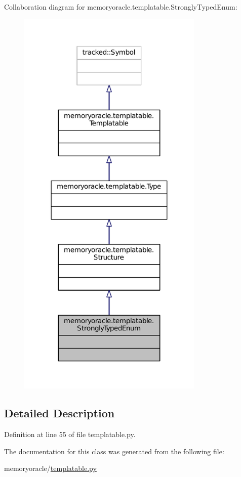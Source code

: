Collaboration diagram for memoryoracle.\+templatable.\+Strongly\+Typed\+Enum\+:\nopagebreak
\begin{figure}[H]
\begin{center}
\leavevmode
\includegraphics[width=251pt]{classmemoryoracle_1_1templatable_1_1StronglyTypedEnum__coll__graph}
\end{center}
\end{figure}


\subsection{Detailed Description}


Definition at line 55 of file templatable.\+py.



The documentation for this class was generated from the following file\+:\begin{DoxyCompactItemize}
\item 
memoryoracle/\hyperlink{templatable_8py}{templatable.\+py}\end{DoxyCompactItemize}
